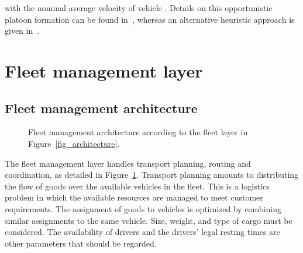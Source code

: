 \documentclass[journal]{IEEEtran}
\begin{document}
with  the nominal average velocity of vehicle . Details on this opportunistic platoon formation can be found in~\cite{Liang2015}, whereas an alternative heuristic approach is given in~\cite{larson_2015}.




\section{Fleet management layer}\label{sec_fleetmanagementlayer}


\subsection{Fleet management architecture}\label{sec_fleetmanagementarchitecture}

\begin{figure}
\begin{center}
\caption{Fleet management architecture according to the fleet layer in Figure~\ref{fig_architecture}.}
\label{fig_architecture_fleetmanagement}
\end{center}
\end{figure}

The fleet management layer handles transport planning, routing and coordination, as detailed in Figure~\ref{fig_architecture_fleetmanagement}. Transport planning amounts to distributing the flow of goods over the available vehicles in the fleet. This is a logistics problem in which the available resources are managed to meet customer requirements. The assignment of goods to vehicles is optimized by combining similar assignments to the same vehicle. Size, weight, and type of cargo must be considered. The availability of drivers and the drivers' legal resting times are other parameters that should be regarded.
\end{document}
